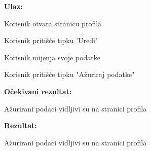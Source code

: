  		\noindent {}
 		\begin{packed_item}
 			
 			\item  \textbf{Ulaz:}
 			
 			\item[] \begin{packed_enum}
 				
 				\item Korisnik otvara stranicu profila
 				\item Korisnik pritišće tipku 'Uredi'
 				\item Korisnik mijenja svoje podatke
 				\item Korisnik pritišće tipku "Ažuriraj podatke"
 				
 			\end{packed_enum}
 			
 			\item \textbf{Očekivani rezultat:}
 			
 			\item[] \begin{packed_enum}
 				
 				\item Ažurirani podaci vidljivi su na stranici profila
 				
 			\end{packed_enum}		
 			
 			\item \textbf{Rezultat:} 
 			
 			\begin{packed_enum}
 				
 				\item Ažurirani podaci vidljivi su na stranici profila
 				
 			\end{packed_enum}
 			
 			
 		\end{packed_item}
 	
